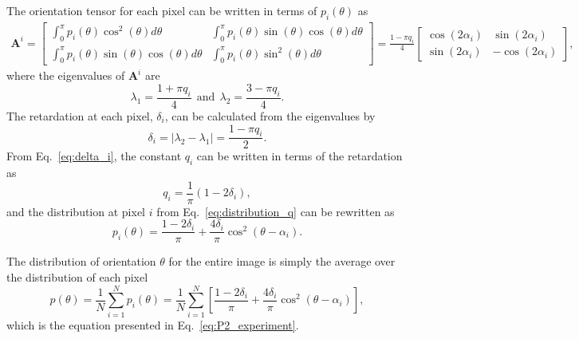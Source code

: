 \documentclass[]{interact}
\begin{document}
The orientation tensor for each pixel can be written in terms of $p_i(\theta)$ as
%
\begin{eqnarray}
\pmb{A}^i = 
\begin{bmatrix}
\int_0^{\pi} p_i(\theta) \cos^2(\theta)d\theta & \int_0^{\pi} p_i(\theta) \sin(\theta) \cos(\theta)d\theta \\
\int_0^{\pi} p_i(\theta) \sin(\theta) \cos(\theta)d\theta & \int_0^{\pi} p_i(\theta) \sin^2(\theta)d\theta
\end{bmatrix} = 
%
\frac{1-\pi q_i}{4} 
\begin{bmatrix}
\cos(2 \alpha_i) & \sin(2 \alpha_i) \\
\sin(2\alpha_i) & - \cos(2\alpha_i)
\end{bmatrix},
\label{eq:Ai}
\end{eqnarray}
%
where the eigenvalues of $\pmb{A}^i$ are
\begin{equation}
\lambda_1 = \frac{1+\pi q_i}{4} \ \ \text{and} \ \ \lambda_2 = \frac{3-\pi q_i}{4}. 
\end{equation}
%
The retardation at each pixel, $\delta_i$, can be calculated from the eigenvalues by
%
\begin{equation}
\delta_i = |\lambda_2 - \lambda_1| = \frac{1-\pi q_i}{2}.
\label{eq:delta_i}
\end{equation}
%
From Eq.\ \eqref{eq:delta_i}, the constant $q_i$ can be written in terms of the retardation as
%
\begin{equation}
q_i = \frac{1}{\pi}(1-2\delta_i),
\end{equation}
%
and the distribution at pixel $i$ from Eq.\ \eqref{eq:distribution_q} can be rewritten as
%
\begin{equation}
p_i(\theta) = \frac{1-2\delta_i}{\pi} + \frac{4 \delta_i}{\pi}\cos^2(\theta-\alpha_i).
\label{eq:distribution_delta}
\end{equation}
%

The distribution of orientation $\theta$ for the entire image is simply the average over the distribution of each pixel
%
\begin{equation}
p(\theta) = \frac{1}{N} \sum_{i=1}^N p_i(\theta) = \frac{1}{N} \sum_{i=1}^N \left[ \frac{1-2\delta_i}{\pi} + \frac{4 \delta_i}{\pi}\cos^2(\theta-\alpha_i) \right],
\end{equation}
%
which is the equation presented in Eq.\ \eqref{eq:P2_experiment}.
\end{document}

